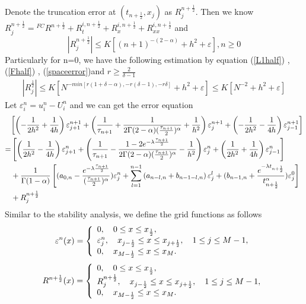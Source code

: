\documentclass[10pt, reqno]{amsart}
\theoremstyle{remark}
\theoremstyle{definition}
\numberwithin{table}{section}
\begin{document}
Denote the truncation error at $(t_{n+\frac{1}{2}}, x_j)$ as $R_j^{n+\frac{1}{2}}$. Then we know $R_j^{n+\frac{1}{2}}={}^{FC}R^{n+\frac{1}{2}}+R_t^{i, n+\frac{1}{2}}+R_x^{i, n+\frac{1}{2}}+R_{xx}^{i, n+\frac{1}{2}}$ and 
$$
|R_j^{n+\frac{1}{2}}|\leq K[(n+1)^{-(2-\alpha)}+h^2+\varepsilon], n\geq 0
$$
Particularly for n=0, we have the following estimation by equation (\ref{L1half}) ,  (\ref{Fhalf}) , (\ref{spaceerror})and $r\geq \frac{2}{\delta-1}$
\begin{align}
|R_j^{\frac{1}{2}}|\leq K[N^{-min[r(1+\delta-\alpha), -r(\delta-1), -r\delta]}+h^2+\varepsilon]\leq K[N^{-2}+h^2+\varepsilon] \label{R_half}
\end{align}
Let $\varepsilon_i^n=u_i^n-U_i^n$ and we can get the error equation 
\begin{align}
&{\left[\left(-\frac{1}{2 h^2}+\frac{1}{4h}\right) \varepsilon_{j+1}^{n+1}+\left(\frac{1}{\tau_{n+1}}+\frac{1}{2\Gamma(2-\alpha)(\frac{\tau_{n+1}}{2})^\alpha}+\frac{1}{h^2}\right) \varepsilon_j^{n+1}+\left(-\frac{1}{2 h^2}-\frac{1}{4h}\right) \varepsilon_{j-1}^{n+1}\right]} \notag \\
=&\left[\left(\frac{1}{2 h^2}-\frac{1}{4h}\right) \varepsilon_{j+1}^{n}+\left(\frac{1}{\tau_{n+1}}-\frac{1-2e^{-\lambda \frac{\tau_{n+1}}{2}}}{2\Gamma(2-\alpha)(\frac{\tau_{n+1}}{2})^\alpha}-\frac{1}{h^2}\right) \varepsilon_j^{n}+\left(\frac{1}{2 h^2}+\frac{1}{4h}\right) \varepsilon_{j-1}^{n}\right] \notag\\
&+\frac{1}{\Gamma(1-\alpha)}\left[(a_{0, n}-\frac{e^{-\lambda \frac{\tau_{n+1}}{2}}}{(\frac{\tau_{n+1}}{2})^\alpha}) \varepsilon_j^n+\sum\limits_{l=1}^{n-1} \left(a_{n-l, n}+b_{n-1-l, n}\right) \varepsilon_j^l+(b_{n-1, n}+\frac{e^{-\lambda t_{n+\frac{1}{2}}}}{t_{n+\frac{1}{2}}^\alpha}) \varepsilon_j^0\right] \notag\\
&+R_j^{n+\frac{1}{2}} \label{converge1}
\end{align}
 Similar to the stability analysis, we define the grid functions as follows
 \begin{equation}\notag
\varepsilon^n(x)=\left\{\begin{array}{l}
0,  \quad 0 \leq x \leq x_{\frac{1}{2}},  \\
\varepsilon_j^n,  \quad x_{j-\frac{1}{2}} \leq x \leq x_{j+\frac{1}{2}},  \quad 1 \leq j \leq M-1,  \\
0,  \quad x_{M-\frac{1}{2}} \leq x \leq x_M . 
\end{array}\right. 
\end{equation}
\begin{equation}\notag
R^{n+\frac{1}{2}}(x)=\left\{\begin{array}{l}
0,  \quad 0 \leq x \leq x_{\frac{1}{2}},  \\
R^{n+\frac{1}{2}}_j,  \quad x_{j-\frac{1}{2}} \leq x \leq x_{j+\frac{1}{2}},  \quad 1 \leq j \leq M-1,  \\
0,  \quad x_{M-\frac{1}{2}} \leq x \leq x_M . 
\end{array}\right. 
\end{equation}
\end{document}

